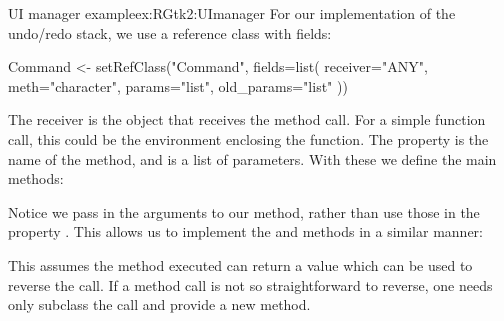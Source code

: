 \begin{example}{UI manager example}{ex:RGtk2:UImanager}
For our implementation of the undo/redo stack, we use a reference
class with fields:
\begin{Schunk}
\begin{Sinput}
 Command <- setRefClass("Command",
                        fields=list(
                          receiver="ANY",
                          meth="character",
                          params="list",
                          old_params="list"
                          ))
\end{Sinput}
\end{Schunk}
%
The receiver is the object that receives the method call. For a simple
function call, this could be the environment enclosing the
function. The  property is the name of the method, and
 is a list of parameters. With these we define the main
methods:
\begin{Schunk}
\end{Schunk}
%

Notice we pass in the arguments to our  method, rather
than use those in the property . This allows us to implement the
 and  methods in a similar manner:
\begin{Schunk}
\end{Schunk}
%
This assumes the method executed can return a value which can be used
to reverse the call. If a method call is not so straightforward to
reverse, one needs only subclass the  call and provide
a new  method.


\end{example}
